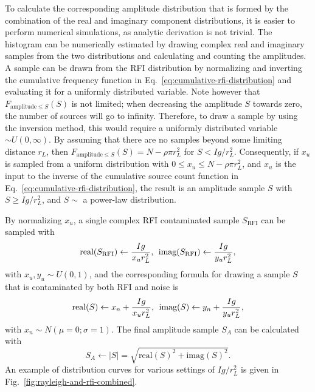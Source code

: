 \documentclass[useAMS,usenatbib]{mn2e}
\begin{document}
To calculate the corresponding amplitude distribution that is formed by the combination of the real and imaginary component distributions, it is easier to perform numerical simulations, as analytic derivation is not trivial. The histogram can be numerically estimated by drawing complex real and imaginary samples from the two distributions and calculating and counting the amplitudes. A sample can be drawn from the RFI distribution by normalizing and inverting the cumulative frequency function in Eq.~\eqref{eq:cumulative-rfi-distribution} and evaluating it for a uniformly distributed variable. Note however that $F_{\textrm{amplitude}\le S}(S)$ is not limited; when decreasing the amplitude $S$ towards zero, the number of sources will go to infinity. Therefore, to draw a sample by using the inversion method, this would require a uniformly distributed variable $\sim U(0,\infty)$. By assuming that there are no samples beyond some limiting distance $r_L$, then $F_{\textrm{amplitude}\le S}(S) = N-\rho \pi r_L^2$ for $S < Ig/r_L^2$. Consequently, if $x_u$ is sampled from a uniform distribution with $0 \le x_u \le N-\rho \pi r_L^2$, and $x_u$ is the input to the inverse of the cumulative source count function in Eq.~\eqref{eq:cumulative-rfi-distribution}, the result is an amplitude sample $S$ with $S \ge Ig/r_L^2$, and $S\sim$ a power-law distribution.

By normalizing $x_u$, a single complex RFI contaminated sample $S_{\textrm{RFI}}$ can be sampled with
\begin{equation} \label{eq:drawing-rfi-distribution}
\textrm{real}(S_{\textrm{RFI}})\leftarrow \frac{Ig}{x_u r_L^2}\textrm{,\hspace{1mm} imag}(S_{\textrm{RFI}}) \leftarrow \frac{Ig}{y_u r_L^2},
\end{equation}
with $x_u, y_u \sim U(0, 1)$, and the corresponding formula for drawing a sample $S$ that is contaminated by both RFI and noise is
\begin{equation} \label{eq:drawing-combined-distribution}
\textrm{real}(S) \leftarrow x_n + \frac{Ig}{x_u r_L^2}
\textrm{,\hspace{1mm} imag}(S) \leftarrow y_n + \frac{Ig}{y_u r_L^2},
\end{equation}
with $x_n \sim N(\mu=0; \sigma=1)$. The final amplitude sample $S_A$ can be calculated with 
\begin{equation} \label{eq:drawing-amplitudes}
S_A \leftarrow |S| = \sqrt{\textrm{real}({S})^2+\textrm{imag}({S})^2}.
\end{equation}
An example of distribution curves for various settings of $Ig/r_L^2$ is given in Fig.~\ref{fig:rayleigh-and-rfi-combined}.
\end{document}
